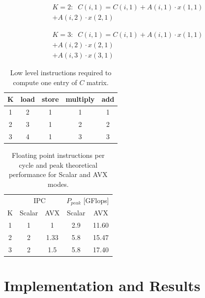 \documentclass[journal, a4paper]{IEEEtran}
\begin{document}
      \begin{equation}      
	\begin{split}
	  K=2:\;\;C(i, 1) = C(i, 1)  + A(i, 1) \cdot x(1, 1) \\+ A(i, 2) \cdot x(2, 1)
	\end{split}
      \end{equation}
      
      \begin{equation}      
	\begin{split}
	  K=3:\;\;C(i, 1) = C(i, 1) + A(i, 1) \cdot x(1, 1) \\+ A(i, 2) \cdot x(2, 1) \\+ A(i, 3) \cdot x(3, 1)
	\end{split}
      \end{equation}
      
  \begin{table}[!hbt]
    \begin{center}
      \caption{Low level instructions required to compute one entry of $C$ matrix.}
      \label{tab:req}
      \begin{tabular}{c|c|c|c|c}
	K	& load & store & multiply & add \\
	\hline
	1	& 2 & 1 & 1 & 1 \\
	\hline
	2	& 3 & 1 & 2 & 2 \\
	\hline
	3	& 4 & 1 & 3 & 3
      \end{tabular}
    \end{center}
  \end{table}
 
  \begin{table}[!hbt]
    \begin{center}
      \caption{Floating point instructions per cycle and peak theoretical performance for Scalar and AVX modes.}
      \label{tab:perf}
      \begin{tabular}{c|c|c|c|c}
		& \multicolumn{2}{c}{IPC} & \multicolumn{2}{c}{$P_{peak}$ [GFlops]} \\
	K	& Scalar & AVX	& Scalar & AVX \\
	\hline
	1	& 1 & 1 & 2.9 & 11.60 \\
	\hline
	2	& 2 & 1.33 & 5.8 & 15.47 \\
	\hline
	3	& 2 & 1.5 & 5.8 & 17.40
      \end{tabular}
    \end{center}
  \end{table}


\section{Implementation and Results}
\end{document}
